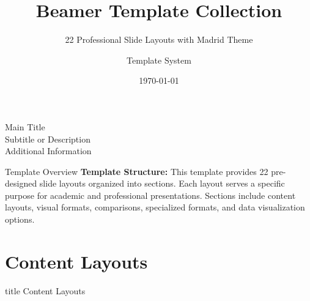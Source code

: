 \documentclass[8pt,aspectratio=169]{beamer}
\title{Beamer Template Collection}
\subtitle{22 Professional Slide Layouts with Madrid Theme}
\author{Template System}
\institute{Academic \& Professional Presentations}
\date{\today}
\begin{document}
\begin{frame}[plain]
\vspace{2cm}
\begin{center}
{\Huge Main Title}\\[0.5cm]
{\Large Subtitle or Description}\\[2cm]
{\normalsize Additional Information}
\end{center}
\end{frame}

\begin{frame}[plain]
\titlepage
\end{frame}

\begin{frame}[t]{Template Overview}
\tableofcontents
\vfill
\footnotesize
\textbf{Template Structure:} This template provides 22 pre-designed slide layouts organized into sections. Each layout serves a specific purpose for academic and professional presentations. Sections include content layouts, visual formats, comparisons, specialized formats, and data visualization options.
\end{frame}

\section{Content Layouts}

\begin{frame}[t]
\vfill
\centering
\begin{beamercolorbox}[sep=8pt,center]{title}
\Large Content Layouts\par
\end{beamercolorbox}
\vfill
\end{frame}
\end{document}
